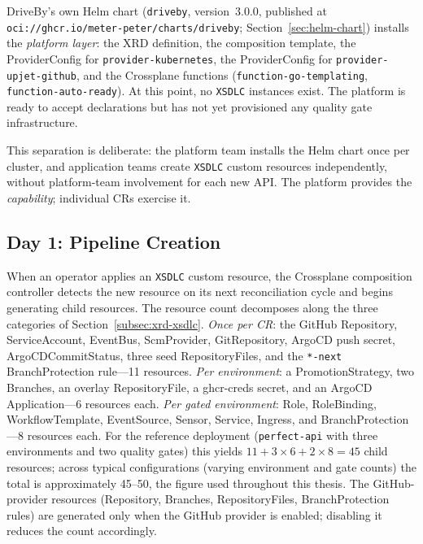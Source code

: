 DriveBy's own Helm chart (\texttt{driveby}, version~3.0.0, published at \texttt{oci://ghcr.io/\allowbreak meter-peter/\allowbreak charts/\allowbreak driveby}; Section~\ref{sec:helm-chart}) installs the \textit{platform layer}: the XRD definition, the composition template, the ProviderConfig for \texttt{provider-kubernetes}, the ProviderConfig for \texttt{provider-upjet-github}, and the Crossplane functions (\texttt{function-\allowbreak go-templating}, \texttt{function-\allowbreak auto-ready}). At this point, no \texttt{XSDLC} instances exist. The platform is ready to accept declarations but has not yet provisioned any quality gate infrastructure.

This separation is deliberate: the platform team installs the Helm chart once per cluster, and application teams create \texttt{XSDLC} custom resources independently, without platform-team involvement for each new API. The platform provides the \textit{capability}; individual CRs exercise it.

\subsection{Day 1: Pipeline Creation}
\label{subsec:day1}

When an operator applies an \texttt{XSDLC} custom resource, the Crossplane composition controller detects the new resource on its next reconciliation cycle and begins generating child resources. The resource count decomposes along the three categories of Section~\ref{subsec:xrd-xsdlc}. \textit{Once per CR}: the GitHub Repository, ServiceAccount, EventBus, ScmProvider, GitRepository, ArgoCD push secret, ArgoCDCommitStatus, three seed RepositoryFiles, and the \texttt{*-next} BranchProtection rule---11 resources. \textit{Per environment}: a PromotionStrategy, two Branches, an overlay RepositoryFile, a ghcr-creds secret, and an ArgoCD Application---6 resources each. \textit{Per gated environment}: Role, RoleBinding, WorkflowTemplate, EventSource, Sensor, Service, Ingress, and BranchProtection---8 resources each. For the reference deployment (\texttt{perfect-api} with three environments and two quality gates) this yields $11 + 3 \times 6 + 2 \times 8 = 45$ child resources; across typical configurations (varying environment and gate counts) the total is approximately 45--50, the figure used throughout this thesis. The GitHub-provider resources (Repository, Branches, RepositoryFiles, BranchProtection rules) are generated only when the GitHub provider is enabled; disabling it reduces the count accordingly.

